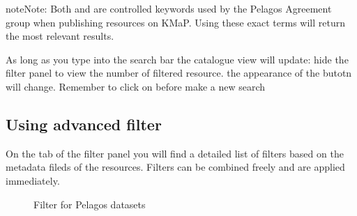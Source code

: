 \documentclass[letterpaper,10pt,english]{sphinxmanual}
\begin{document}
\begin{sphinxadmonition}{note}{Note:}
\sphinxAtStartPar
Both  and  are controlled keywords used by
the Pelagos Agreement group when publishing resources on KMaP. Using these exact terms
will return the most relevant results.
\end{sphinxadmonition}

\sphinxAtStartPar
As long as you type into the search bar the catalogue view will update: hide the filter panel to view the number of filtered resource.
the appearance of the  butotn will change. Remember to click on  before make a new search


\subsection{Using advanced filter}
\label{\detokenize{02_find_and_visualize:using-advanced-filter}}\label{\detokenize{02_find_and_visualize:advanced-filter}}
\sphinxAtStartPar
On the  tab of the filter panel you will find a detailed list of filters based on the metadata fileds of the resources.
Filters can be combined freely and are applied immediately.

\begin{figure}[htbp]
\centering
\capstart

\noindent{}
\caption{Filter for Pelagos datasets}\label{\detokenize{02_find_and_visualize:id4}}\end{figure}
\end{document}
